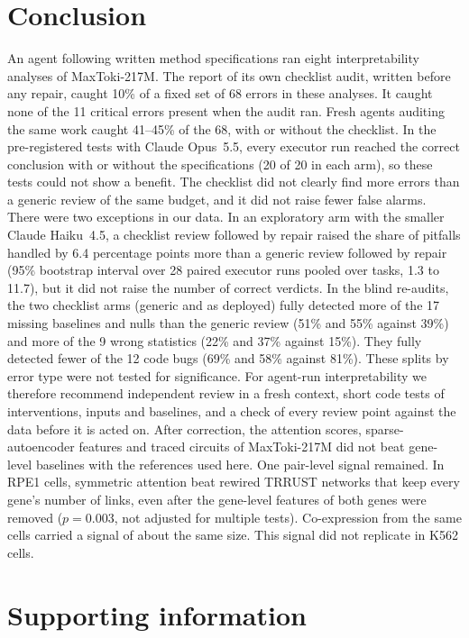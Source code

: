 \documentclass[10pt,letterpaper]{article}
\begin{document}
\section*{Conclusion}
An agent following written method specifications ran eight
interpretability analyses of MaxToki-217M. The report of its own
checklist audit, written before any repair, caught 10\% of a fixed set of
68 errors in these analyses. It caught none of the 11 critical errors
present when the audit ran. Fresh agents auditing the same work caught
41--45\% of the 68, with or without the checklist. In the pre-registered
tests with Claude Opus~5.5, every executor run reached the correct
conclusion with or without the specifications (20 of 20 in each arm), so
these tests could not show a benefit. The checklist did not clearly find
more errors than a generic review of the same budget, and it did not
raise fewer false alarms. There were two exceptions in our data. In an
exploratory arm with the smaller Claude Haiku~4.5, a checklist review
followed by repair raised the share of pitfalls handled by 6.4
percentage points more than a generic review followed by repair (95\%
bootstrap interval over 28 paired executor runs pooled over tasks, 1.3
to 11.7), but it did not raise the number of correct verdicts. In the
blind re-audits, the two checklist arms (generic and as deployed) fully
detected more of the 17 missing baselines and nulls than the generic
review (51\% and 55\% against 39\%) and more of the 9 wrong statistics
(22\% and 37\% against 15\%). They fully detected fewer of the 12 code
bugs (69\% and 58\% against 81\%). These splits by error type were not
tested for significance. For agent-run interpretability we therefore
recommend independent review in a fresh context, short code tests of
interventions, inputs and baselines, and a check of every review point
against the data before it is acted on. After correction, the attention
scores, sparse-autoencoder features and traced circuits of MaxToki-217M
did not beat gene-level baselines with the references used here. One
pair-level signal remained. In RPE1 cells, symmetric attention beat
rewired TRRUST networks that keep every gene's number of links, even
after the gene-level features of both genes were removed ($p = 0.003$,
not adjusted for multiple tests). Co-expression from the same cells
carried a signal of about the same size. This signal did not replicate
in K562 cells.

\section*{Supporting information}
\end{document}
